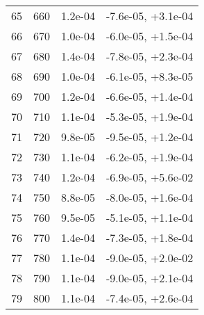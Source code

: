 \begin{table}
\begin{adjustbox}{width=1\textwidth/2}
\begin{tabular}{|c|c|c|c|}
\cline{1-4}
65 & 660 & 1.2e-04 & -7.6e-05, +3.1e-04 \\
\cline{1-4}
66 & 670 & 1.0e-04 & -6.0e-05, +1.5e-04 \\
\cline{1-4}
67 & 680 & 1.4e-04 & -7.8e-05, +2.3e-04 \\
\cline{1-4}
68 & 690 & 1.0e-04 & -6.1e-05, +8.3e-05 \\
\cline{1-4}
69 & 700 & 1.2e-04 & -6.6e-05, +1.4e-04 \\
\cline{1-4}
70 & 710 & 1.1e-04 & -5.3e-05, +1.9e-04 \\
\cline{1-4}
71 & 720 & 9.8e-05 & -9.5e-05, +1.2e-04 \\
\cline{1-4}
72 & 730 & 1.1e-04 & -6.2e-05, +1.9e-04 \\
\cline{1-4}
73 & 740 & 1.2e-04 & -6.9e-05, +5.6e-02 \\
\cline{1-4}
74 & 750 & 8.8e-05 & -8.0e-05, +1.6e-04 \\
\cline{1-4}
75 & 760 & 9.5e-05 & -5.1e-05, +1.1e-04 \\
\cline{1-4}
76 & 770 & 1.4e-04 & -7.3e-05, +1.8e-04 \\
\cline{1-4}
77 & 780 & 1.1e-04 & -9.0e-05, +2.0e-02 \\
\cline{1-4}
78 & 790 & 1.1e-04 & -9.0e-05, +2.1e-04 \\
\cline{1-4}
79 & 800 & 1.1e-04 & -7.4e-05, +2.6e-04 \\
\cline{1-4}
\end{tabular}
\end{adjustbox}
\end{table}

